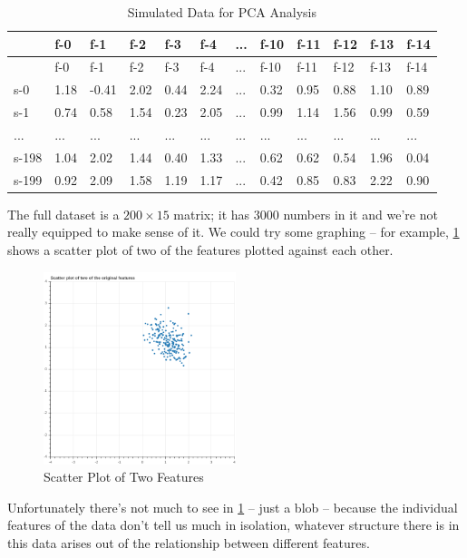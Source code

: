 \documentclass[
  oneside]{scrbook}
\begin{document}
\begin{longtable}[]{@{}llllllllllll@{}}
\caption{Simulated Data for PCA Analysis
\label{tbl:rawdata}}\tabularnewline
\toprule
& f-0 & f-1 & f-2 & f-3 & f-4 & ... & f-10 & f-11 & f-12 & f-13 &
f-14 \\
\midrule
\endfirsthead
\toprule
& f-0 & f-1 & f-2 & f-3 & f-4 & ... & f-10 & f-11 & f-12 & f-13 &
f-14 \\
\midrule
\endhead
s-0 & 1.18 & -0.41 & 2.02 & 0.44 & 2.24 & ... & 0.32 & 0.95 & 0.88 &
1.10 & 0.89 \\
s-1 & 0.74 & 0.58 & 1.54 & 0.23 & 2.05 & ... & 0.99 & 1.14 & 1.56 & 0.99
& 0.59 \\
... & ... & ... & ... & ... & ... & ... & ... & ... & ... & ... & ... \\
s-198 & 1.04 & 2.02 & 1.44 & 0.40 & 1.33 & ... & 0.62 & 0.62 & 0.54 &
1.96 & 0.04 \\
s-199 & 0.92 & 2.09 & 1.58 & 1.19 & 1.17 & ... & 0.42 & 0.85 & 0.83 &
2.22 & 0.90 \\
\bottomrule
\end{longtable}

The full dataset is a \(200\times 15\) matrix; it has \(3000\) numbers
in it and we're not really equipped to make sense of it. We could try
some graphing -- for example, \cref{fig:features} shows a scatter plot
of two of the features plotted against each other.

\begin{figure}
\hypertarget{fig:features}{%
\centering
\includegraphics[width=0.5\textwidth,height=\textheight]{img/features.png}
\caption{Scatter Plot of Two Features}\label{fig:features}
}
\end{figure}

Unfortunately there's not much to see in \cref{fig:features} -- just a
blob -- because the individual features of the data don't tell us much
in isolation, whatever structure there is in this data arises out of the
relationship between different features.
\end{document}
